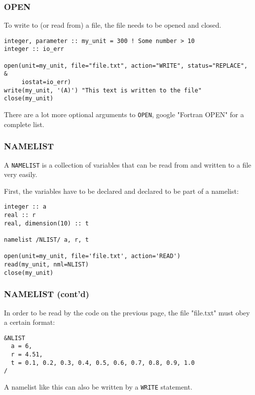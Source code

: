 \begin{frame}[fragile]
  \frametitle{OPEN}

  To write to (or read from) a file, the file needs to be opened and closed.

  \begin{lstlisting}
integer, parameter :: my_unit = 300 ! Some number > 10
integer :: io_err

open(unit=my_unit, file="file.txt", action="WRITE", status="REPLACE", &
     iostat=io_err)
write(my_unit, '(A)') "This text is written to the file"
close(my_unit)
  \end{lstlisting}

  There are a lot more optional arguments to \texttt{OPEN}, google "Fortran OPEN" for a complete list.

\end{frame}

\begin{frame}[fragile]
  \frametitle{NAMELIST}

  A \texttt{NAMELIST} is a collection of variables that can be read from and
  written to a file very easily.

  First, the variables have to be declared and declared to be part of a namelist:

  \begin{lstlisting}
integer :: a
real :: r
real, dimension(10) :: t

namelist /NLIST/ a, r, t

open(unit=my_unit, file='file.txt', action='READ')
read(my_unit, nml=NLIST)
close(my_unit)
  \end{lstlisting}

\end{frame}

\begin{frame}[fragile]
  \frametitle{NAMELIST (cont'd)}

  In order to be read by the code on the previous page, the file "file.txt" must
  obey a certain format:

  \begin{lstlisting}
&NLIST
  a = 6,
  r = 4.51,
  t = 0.1, 0.2, 0.3, 0.4, 0.5, 0.6, 0.7, 0.8, 0.9, 1.0
/
  \end{lstlisting}

  A namelist like this can also be written by a \texttt{WRITE} statement.

\end{frame}
